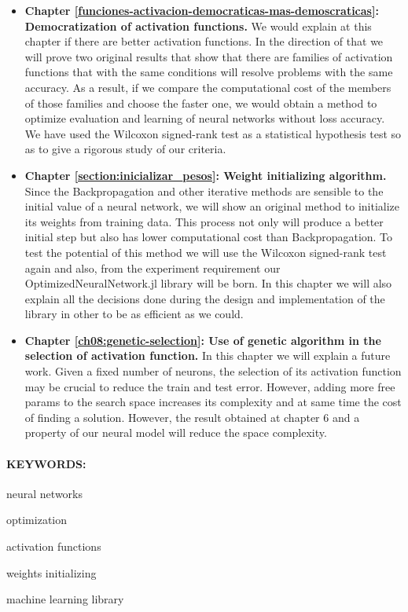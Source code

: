 \begin{itemize}
\item \textbf{Chapter \ref{funciones-activacion-democraticas-mas-demoscraticas}: Democratization of activation functions.} We would explain at this chapter if there are better activation functions. In the direction of that we will prove two original results that show that there are families of activation functions that with the same conditions will resolve problems with the same accuracy. As a result, if we compare the computational cost of the members of those families and choose the faster one, we would obtain a method to optimize evaluation and learning of neural networks without loss accuracy. We have used the Wilcoxon signed-rank test as a statistical hypothesis test so as to give a rigorous study of our criteria. 

\item \textbf{Chapter \ref{section:inicializar_pesos}: Weight initializing algorithm.} Since the Backpropagation and other iterative  methods are sensible to the initial value of a neural network, we will show an original method to initialize its weights from training data. This process not only will produce a better initial step but also has lower computational cost than Backpropagation.  To test the potential of this method we will use the Wilcoxon signed-rank test again and also, from the experiment requirement our OptimizedNeuralNetwork.jl library will be born. In this chapter we will also explain all the decisions done during the design and implementation of the library in other to be as efficient as we could.	

\item \textbf{Chapter \ref{ch08:genetic-selection}: Use of genetic algorithm in the selection of activation function.} In this chapter we will explain a future work. Given a fixed number of neurons, the selection of its activation function may be crucial to reduce the train and test error.  However, adding more free params to the search space increases its complexity and at same time the cost of finding a solution.  However, the result obtained at chapter 6 and a property of our neural model will reduce the space complexity.
\end{itemize} 

\paragraph{KEYWORDS:}
\begin{itemize*}[label=,itemsep=1em,itemjoin=\hspace{1em}]
  \item neural networks
  \item optimization
  \item activation functions
  \item weights initializing
  \item machine learning library

\end{itemize*}

\endinput
